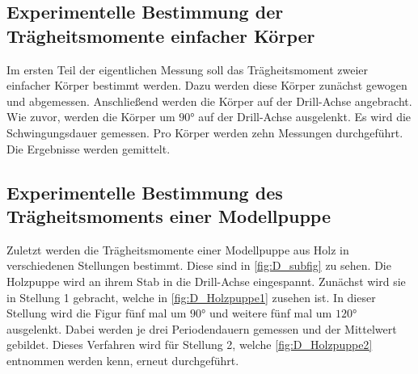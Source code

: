 \subsection{Experimentelle Bestimmung der Trägheitsmomente einfacher Körper}
\label{subsec:D_Körper}
Im ersten Teil der eigentlichen Messung soll das Trägheitsmoment zweier einfacher Körper bestimmt werden. Dazu werden diese Körper zunächst gewogen und abgemessen. Anschließend
werden die Körper auf der Drill-Achse angebracht. Wie zuvor, werden
die Körper um $90\unit{\degree}$ auf der Drill-Achse ausgelenkt. Es wird die Schwingungsdauer gemessen. Pro Körper werden zehn Messungen durchgeführt. Die Ergebnisse werden gemittelt.
\subsection{Experimentelle Bestimmung des Trägheitsmoments einer Modellpuppe}
\label{subsec:D_Figur}
Zuletzt werden die Trägheitsmomente einer Modellpuppe aus Holz in verschiedenen Stellungen bestimmt. Diese sind in \autoref{fig:D_subfig} zu sehen.
Die Holzpuppe wird an ihrem Stab in die Drill-Achse eingespannt. Zunächst wird sie in Stellung 1 gebracht, welche in \autoref{fig:D_Holzpuppe1} zusehen ist. In dieser Stellung wird die Figur fünf 
mal um $90\unit{\degree}$ und weitere fünf mal um $120\unit{\degree}$ ausgelenkt. Dabei werden je drei Periodendauern gemessen und der Mittelwert gebildet. Dieses Verfahren wird für 
Stellung 2, welche \autoref{fig:D_Holzpuppe2} entnommen werden kenn, erneut durchgeführt. 
